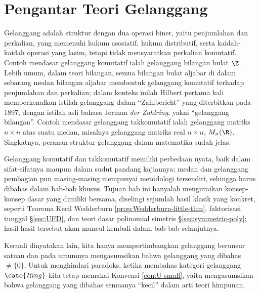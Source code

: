 
\chapter{Pengantar Teori Gelanggang}\label{sec:ring}
Gelanggang adalah struktur dengan dua operasi biner, yaitu penjumlahan dan perkalian, yang memenuhi hukum asosiatif, hukum distributif, serta kaidah-kaidah operasi yang lazim, tetapi tidak mensyaratkan perkalian komutatif. Contoh mendasar gelanggang komutatif ialah gelanggang bilangan bulat $\Z$. Lebih umum, dalam teori bilangan, semua bilangan bulat aljabar di dalam sebarang medan bilangan aljabar membentuk gelanggang komutatif terhadap penjumlahan dan perkalian; dalam konteks inilah Hilbert pertama kali memperkenalkan istilah gelanggang dalam ``Zahlbericht'' yang diterbitkan pada 1897, dengan istilah asli bahasa Jerman \textit{der Zahlring}, yakni ``gelanggang bilangan''. Contoh mendasar gelanggang takkomutatif ialah gelanggang matriks $n \times n$ atas suatu medan, misalnya gelanggang matriks real $n \times n$, $M_n(\R)$. Singkatnya, peranan struktur gelanggang dalam matematika sudah jelas.

Gelanggang komutatif dan takkomutatif memiliki perbedaan nyata, baik dalam sifat-sifatnya maupun dalam sudut pandang kajiannya; medan dan gelanggang pembagian pun masing-masing mempunyai metodologi tersendiri, sehingga harus dibahas dalam bab-bab khusus. Tujuan bab ini hanyalah menguraikan konsep-konsep dasar yang dimiliki bersama, diselingi sejumlah hasil klasik yang konkret, seperti Teorema Kecil Wedderburn \ref{prop:Wedderburn-little-thm}, faktorisasi tunggal \S\ref{sec:UFD}, dan teori dasar polinomial simetris \S\ref{sec:symmetric-poly}; hasil-hasil tersebut akan muncul kembali dalam bab-bab selanjutnya.

Kecuali dinyatakan lain, kita hanya mempertimbangkan gelanggang berunsur satuan dan pada umumnya mengasumsikan bahwa gelanggang yang dibahas $\neq \{0\}$. Untuk menghindari paradoks, ketika membahas kategori gelanggang $\cate{Ring}$ kita tetap memakai Konvensi \ref{con:U-small}, yaitu mengasumsikan bahwa gelanggang yang dibahas semuanya ``kecil'' dalam arti teori himpunan.

